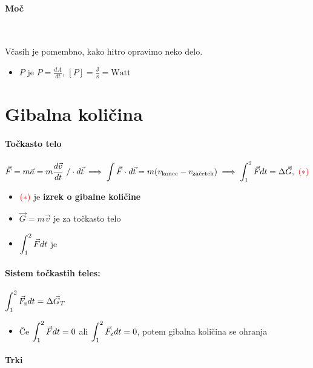 \paragraph{Moč} \ 

Včasih je pomembno, kako hitro opravimo neko delo.

\begin{itemize}
    \item {} \(P\) je \(P = \frac{dA}{dt}\), \([P] = \frac{\text{J}}{\text{s}} = \text{Watt}\)
\end{itemize}

\section{Gibalna količina}
\paragraph{Točkasto telo}
\[\vec{F} = m \vec{a} = m \frac{d \vec{v}}{dt} \ / \cdot d \vec{t} \implies \int \vec{F} \cdot d \vec{t} = m(v_\text{konec} - v_\text{začetek}) \implies \int_{1}^{2}  \vec{F} dt = \Delta \vec{G}, \ \textcolor{red}{(*)}\]
\begin{itemize}
    \item \(\textcolor{red}{(*)}\) je \textbf{izrek o gibalne količine}
    \item \(\vec{G} = m \vec{v}\) je  za točkasto telo
    \item \(\displaystyle \int_{1}^{2} \vec{F} dt\) je 
\end{itemize}

\paragraph{Sistem točkastih teles: } \(\displaystyle \int_{1}^{2} \vec{F}_\text{z} dt = \Delta \vec{G}_T\)

\begin{itemize}
    \item Če \(\displaystyle \int_{1}^{2} \vec{F} dt = 0\) ali \(\displaystyle \int_{1}^{2} \vec{F}_\text{z} dt = 0\), potem gibalna količina se ohranja
\end{itemize}

\paragraph{Trki} \ 

